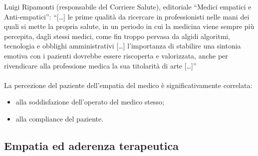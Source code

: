 Luigi Ripamonti (responsabile del Corriere Salute), editoriale ``Medici
empatici e Anti-empatici'': ``{[}\ldots{}{]} le prime qualità da
ricercare in professionisti nelle mani dei quali si mette la propria
salute, in un periodo in cui la medicina viene sempre più percepita,
dagli stessi medici, come fin troppo pervasa da algidi algoritmi,
tecnologia e obblighi amministrativi {[}\ldots{}{]} l'importanza di
stabilire una sintonia emotiva con i pazienti dovrebbe essere riscoperta
e valorizzata, anche per rivendicare alla professione medica la sua
titolarità di arte {[}\ldots{}{]}''
\\\\
La percezione del paziente dell'empatia del medico è significativamente
correlata:

\begin{itemize}
\item
  alla soddisfazione dell'operato del medico stesso;
\item
  alla compliance del paziente.
\end{itemize}

\subsection{Empatia ed aderenza terapeutica}

